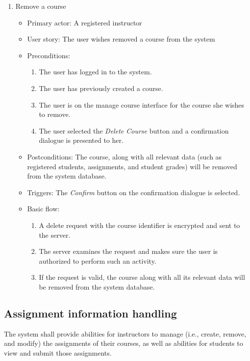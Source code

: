 \begin{enumerate}
\item Remove a course
\begin{itemize}
    \item Primary actor: A registered instructor
    \item User story: The user wishes removed a course from the system
    \item Preconditions:
        \begin{enumerate}
            \item The user has logged in to the system.
            \item The user has previously created a course.
            \item The user is on the manage course interface for the course
                she wishes to remove.
            \item The user selected the \emph{Delete Course} button and a
                confirmation dialogue is presented to her.
        \end{enumerate}
    \item Postconditions:
        The course, along with all relevant data (such as registered students,
        assignments, and student grades) will be removed from the system
        database.
    \item Triggers: The \emph{Confirm} button on the confirmation dialogue is
        selected.
    \item Basic flow:
        \begin{enumerate}
            \item A delete request with the course identifier is encrypted
                and sent to the server.
            \item The server examines the request and makes sure the user is
                authorized to perform such an activity.
            \item If the request is valid, the course along with all its
                relevant data will be removed from the system database.
        \end{enumerate}
\end{itemize}

\end{enumerate}

\subsection{Assignment information handling}
The system shall provide abilities for instructors to manage (i.e., create,
remove, and modify) the assignments of their courses, as well as abilities for
students to view and submit those assignments.

